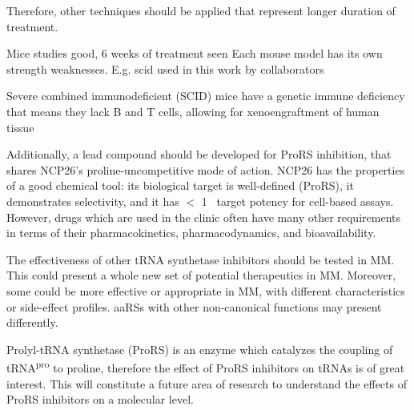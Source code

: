 Therefore, other techniques should be applied that represent longer duration of treatment.


Mice studies good, 6 weeks of treatment seen
Each mouse model has its own strength weaknesses. E.g. scid used in this work by collaborators\cite{rossi2018mouse}

Severe combined immunodeficient (SCID) mice have a genetic immune deficiency that means they lack B and T cells, allowing for xenoengraftment of human tissue


Additionally, a lead compound should be developed for ProRS inhibition, that shares NCP26's proline-uncompetitive mode of action.
NCP26 has the properties of a good chemical tool: its biological target is well-defined (ProRS), it demonstrates selectivity, and it has $<$ 1\si{\micro\Molar} target potency for cell-based assays.
However, drugs which are used in the clinic often have many other requirements in terms of their pharmacokinetics, pharmacodynamics, and bioavailability.


The effectiveness of other tRNA synthetase inhibitors should be tested in MM\@.
This could present a whole new set of potential therapeutics in MM\@.
Moreover, some could be more effective or appropriate in MM, with different characteristics or side-effect profiles.
aaRSs with other non-canonical functions may present differently.

Prolyl-tRNA synthetase (ProRS) is an enzyme which catalyzes the coupling of tRNA\textsuperscript{pro} to proline, therefore the effect of ProRS inhibitors on tRNAs is of great interest.
This will constitute a future area of research to understand the effects of ProRS inhibitors on a molecular level.


%
%
%
%
